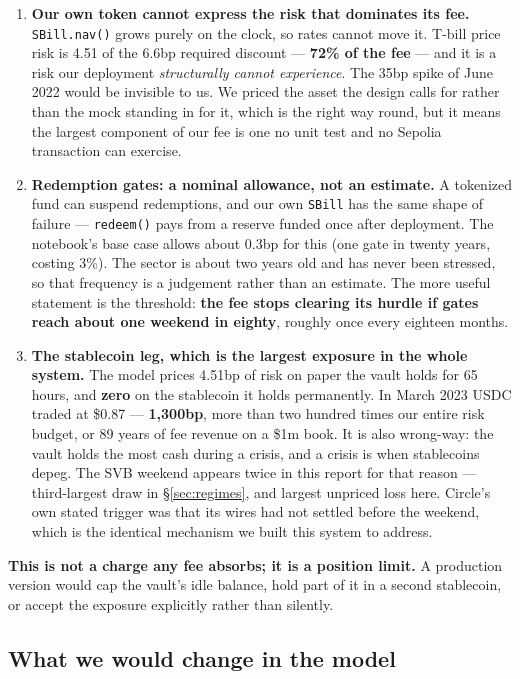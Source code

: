 \documentclass[11pt,a4paper]{article}
\begin{document}
\begin{enumerate}
  \item \textbf{Our own token cannot express the risk that dominates its fee.} \texttt{SBill.nav()}
  grows purely on the clock, so rates cannot move it. T-bill price risk is 4.51 of the 6.6bp required
  discount — \textbf{72\% of the fee} — and it is a risk our deployment \emph{structurally cannot
  experience}. The 35bp spike of June 2022 would be invisible to us. We priced the asset the design
  calls for rather than the mock standing in for it, which is the right way round, but it means the
  largest component of our fee is one no unit test and no Sepolia transaction can exercise.
  \item \textbf{Redemption gates: a nominal allowance, not an estimate.} A tokenized fund can
  suspend redemptions, and our own \texttt{SBill} has the same shape of failure — \texttt{redeem()}
  pays from a reserve funded once after deployment. The notebook's base case allows about 0.3bp for
  this (one gate in twenty years, costing 3\%). The sector is about two years old and has never been
  stressed, so that frequency is a judgement rather than an estimate. The more useful statement is
  the threshold: \textbf{the fee stops clearing its hurdle if gates reach about one weekend in
  eighty}, roughly once every eighteen months.
  \item \textbf{The stablecoin leg, which is the largest exposure in the whole system.} The model
  prices 4.51bp of risk on paper the vault holds for 65 hours, and \textbf{zero} on the stablecoin it
  holds permanently. In March 2023 USDC traded at \$0.87 — \textbf{1,300bp}, more than two hundred
  times our entire risk budget, or 89 years of fee revenue on a \$1m book. It is also wrong-way: the
  vault holds the most cash during a crisis, and a crisis is when stablecoins depeg. The SVB weekend
  appears twice in this report for that reason — third-largest draw in \S\ref{sec:regimes}, and
  largest unpriced loss here. Circle's own stated trigger was that its wires had not settled before
  the weekend, which is the identical mechanism we built this system to address.
\end{enumerate}

\textbf{This is not a charge any fee absorbs; it is a position limit.} A production version would cap
the vault's idle balance, hold part of it in a second stablecoin, or accept the exposure explicitly
rather than silently.

\subsection{What we would change in the model}
\end{document}
